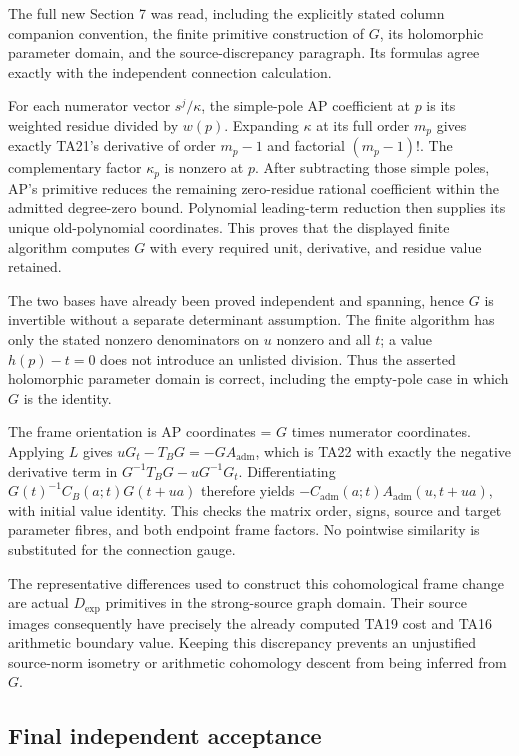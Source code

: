 The full new Section 7 was read, including the explicitly stated column
companion convention, the finite primitive construction of \(G\), its
holomorphic parameter domain, and the source-discrepancy paragraph.
Its formulas agree exactly with the independent connection calculation.


For each numerator vector \(s^j/\kappa\), the simple-pole AP coefficient at
\(p\) is its weighted residue divided by \(w(p)\). Expanding \(\kappa\) at its full
order \(m_p\) gives exactly TA21's derivative of order \(m_p-1\) and factorial
\((m_p-1)!\). The complementary factor \(\kappa_p\) is nonzero at \(p\). After
subtracting those simple poles, AP's primitive reduces the remaining
zero-residue rational coefficient within the admitted degree-zero bound.
Polynomial leading-term reduction then supplies its unique old-polynomial
coordinates. This proves that the displayed finite algorithm computes \(G\)
with every required unit, derivative, and residue value retained.


The two bases have already been proved independent and spanning, hence
\(G\) is invertible without a separate determinant assumption. The finite
algorithm has only the stated nonzero denominators on \(u\) nonzero and
all \(t\); a value \(h(p)-t=0\) does not introduce an unlisted division. Thus
the asserted holomorphic parameter domain is correct, including the
empty-pole case in which \(G\) is the identity.


The frame orientation is AP coordinates = \(G\) times numerator coordinates.
Applying \(L\) gives \(uG_t-T_BG=-GA_{\mathrm{adm}}\), which is TA22 with exactly
the negative derivative term in \(G^{-1}T_BG-uG^{-1}G_t\).
Differentiating
\(G(t)^{-1}C_B(a;t)G(t+ua)\) therefore yields
\(-C_{\mathrm{adm}}(a;t)A_{\mathrm{adm}}(u,t+ua)\), with initial value identity. This checks
the matrix order, signs, source and target parameter fibres, and both
endpoint frame factors. No pointwise similarity is substituted for the
connection gauge.


The representative differences used to construct this cohomological
frame change are actual \(D_{\mathrm{exp}}\) primitives in the strong-source graph
domain. Their source images consequently have precisely the already
computed TA19 cost and TA16 arithmetic boundary value. Keeping this
discrepancy prevents an unjustified source-norm isometry or arithmetic
cohomology descent from being inferred from \(G\).


\subsection*{Final independent acceptance}



